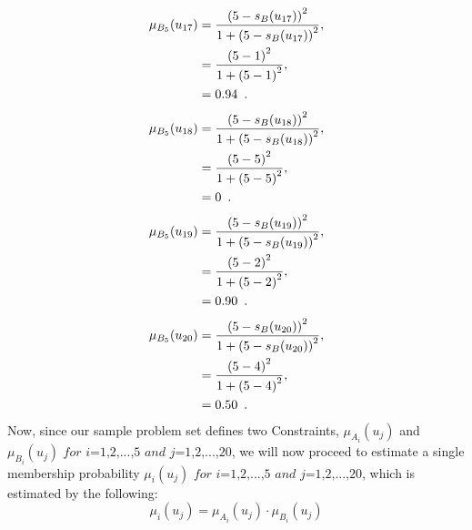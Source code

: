 \documentclass[a4paper,openany]{book}
\begin{document}
				\begin{align}
					\mu_{B_5}(u_{17}) &= \frac{\left(5-s_B(u_{17})\right)^2}{1 + \left(5-s_B(u_{17})\right)^2} ,\\
					&= \frac{\left(5-1\right)^2}{1 + \left(5-1\right)^2} \notag ,\\
					&= 0.94 \enspace. \notag
				\end{align}
				\begin{align}
					\mu_{B_5}(u_{18}) &= \frac{\left(5-s_B(u_{18})\right)^2}{1 + \left(5-s_B(u_{18})\right)^2} ,\\
					&= \frac{\left(5-5\right)^2}{1 + \left(5-5\right)^2} \notag ,\\
					&= 0 \enspace. \notag
				\end{align}
				\begin{align}
					\mu_{B_5}(u_{19}) &= \frac{\left(5-s_B(u_{19})\right)^2}{1 + \left(5-s_B(u_{19})\right)^2} ,\\
					&= \frac{\left(5-2\right)^2}{1 + \left(5-2\right)^2} \notag ,\\
					&= 0.90 \enspace. \notag
				\end{align}
				\begin{align}
					\mu_{B_5}(u_{20}) &= \frac{\left(5-s_B(u_{20})\right)^2}{1 + \left(5-s_B(u_{20})\right)^2} ,\\
					&= \frac{\left(5-4\right)^2}{1 + \left(5-4\right)^2} \notag ,\\
					&= 0.50 \enspace. \notag
				\end{align}
			\newpage
				Now, since our sample problem set defines two Constraints, $\mu_{A_i}(u_j)$ and $\mu_{B_i}(u_j) \textit{ for i=1,2,...,5 and j=1,2,...,20}$, we will now proceed to estimate a single membership probability $\mu_i(u_j)  \textit{ for i=1,2,...,5 and j=1,2,...,20}$, which is estimated by the following:
				\begin{equation}
					\mu_i(u_j) = \mu_{A_i}(u_j) \cdot \mu_{B_i}(u_j)
				\end{equation}
\end{document}
